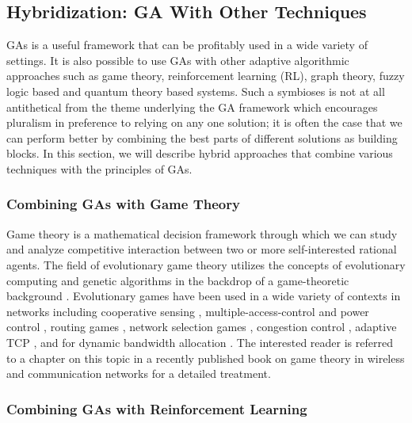 \documentclass[journal]{IEEEtran}
\begin{document}
\subsection{\textbf{Hybridization: GA With Other Techniques}}
\label{sec:Hybrid}

GAs is a useful framework that can be profitably used in a wide variety of settings. It is also possible to use GAs with other adaptive algorithmic  approaches such as game theory, reinforcement learning (RL), graph theory, fuzzy logic based and quantum theory based systems. Such a symbioses is not at all antithetical from the theme underlying the GA framework which encourages pluralism in preference to relying on any one solution; it is often the case that we can perform better by combining the best parts of different solutions as building blocks. In this section, we will describe hybrid approaches that combine various techniques with the principles of GAs. 

\vspace{2mm}
\subsubsection{Combining GAs with Game Theory}

Game theory is a mathematical decision framework through which we can study and analyze competitive interaction between two or more self-interested rational agents. The field of evolutionary game theory utilizes the concepts of evolutionary computing and genetic algorithms in the backdrop of a game-theoretic background \cite{weibull1997evolutionary}. Evolutionary games have been used in a wide variety of contexts in networks including cooperative sensing \cite{wang2010evolutionary}, multiple-access-control and power control \cite{tembine2010evolutionary}, routing games \cite{altman2007evolutionary}, network selection games \cite{niyato2009dynamics}, congestion control \cite{altman2008evolutionary}, adaptive TCP \cite{anastasopoulos2010tcp}, and for dynamic bandwidth allocation \cite{zhu2010optimal}. The interested reader is referred to a chapter on this topic in a recently published book on game theory in wireless and communication networks \cite{han2012gamech} for a detailed treatment.

\vspace{2mm}
\subsubsection{Combining GAs with Reinforcement Learning}
\end{document}
